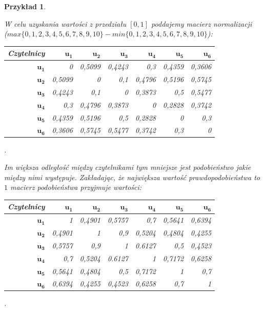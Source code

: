 \documentclass[12pt,a4paper]{report}
\newtheorem{przyklad}{Przykład}[chapter]
\begin{document}
\begin{przyklad}
\begin{center}
\end{center}
W celu uzyskania wartości z przedziału $[0,1]$ poddajemy macierz normalizacji 
\\($max\{0,1,2,3,4,5,6,7,8,9,10\} - min\{0,1,2,3,4,5,6,7,8,9,10\}$):
\begin{center}
\begin{tabular}{|r|r|r|r|r|r|r|} \hline
\textbf{Czytelnicy} & $\mathbf{u_1}$ & $\mathbf{u_2}$ & $\mathbf{u_3}$ & $\mathbf{u_4}$ & $\mathbf{u_5}$ & $\mathbf{u_6}$ \\
\hline
$\mathbf{u_1}$ & 0 & 0,5099 & 0,4243 & 0,3 & 0,4359 & 0,3606 \\
\hline
$\mathbf{u_2}$ & 0,5099 & 0 & 0,1 & 0,4796 & 0,5196 & 0,5745 \\
\hline
$\mathbf{u_3}$ & 0,4243 & 0,1 & 0 & 0,3873 & 0,5 & 0,5477 \\
\hline
$\mathbf{u_4}$ & 0,3 & 0,4796 & 0,3873 & 0 & 0,2828 & 0,3742 \\ 
\hline 
$\mathbf{u_5}$ & 0,4359 & 0,5196 & 0,5 & 0,2828 & 0 & 0,3 \\
\hline 
$\mathbf{u_6}$ & 0,3606 & 0,5745 & 0,5477 & 0,3742 & 0,3 & 0 \\ 
\hline 
\end{tabular}.
\end{center}
Im większa odległość między czytelnikami tym mniejsze jest podobieństwo jakie między nimi występuje.
Zakładając, że największa wartość prawdopodobieństwa to $1$ macierz podobieństwa przyjmuje wartości:
\begin{center}
\begin{tabular}{|r|r|r|r|r|r|r|} \hline
\textbf{Czytelnicy} & $\mathbf{u_1}$ & $\mathbf{u_2}$ & $\mathbf{u_3}$ & $\mathbf{u_4}$ & $\mathbf{u_5}$ & $\mathbf{u_6}$ \\
\hline
$\mathbf{u_1}$ & 1 & 0,4901 & 0,5757 & 0,7 & 0,5641 & 0,6394 \\
\hline
$\mathbf{u_2}$ & 0,4901 & 1 & 0,9 & 0,5204 & 0,4804 & 0,4255 \\
\hline
$\mathbf{u_3}$ & 0,5757 & 0,9 & 1 & 0.6127 & 0,5 & 0,4523 \\
\hline
$\mathbf{u_4}$ & 0,7 & 0,5204 & 0.6127 & 1 & 0,7172 & 0,6258 \\ 
\hline 
$\mathbf{u_5}$ & 0,5641 & 0,4804 & 0,5 & 0,7172 & 1 & 0,7 \\
\hline 
$\mathbf{u_6}$ & 0,6394 & 0,4255 & 0,4523 & 0,6258 & 0,7 & 1 \\ 
\hline 
\end{tabular}.
\end{center}

\end{przyklad}
\end{document}
